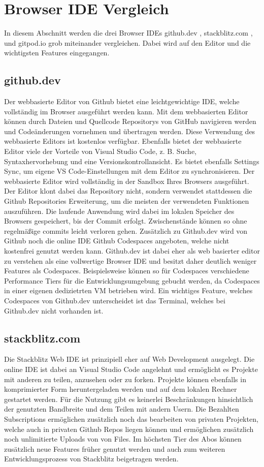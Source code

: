 \section{Browser IDE Vergleich}
In diesem Abschnitt werden die drei Browser IDEs
github.dev \cite{githubDevWebsite},
stackblitz.com \cite{stackblitzcomWebsite},
und
gitpod.io \cite{gitpodioWebsite}
grob miteinander vergleichen.
Dabei wird auf den Editor und die wichtigsten Features eingegangen.

\subsection{github.dev}
Der webbasierte Editor von Github bietet eine leichtgewichtige IDE, welche vollständig im Browser ausgeführt werden kann. Mit dem webbasierten Editor können durch Dateien und Quellcode Repositorys von GitHub navigieren werden und Codeänderungen vornehmen und übertragen werden. Diese Verwendung des webbasierte Editors ist kostenlos verfügbar.
Ebenfalls bietet der webbasierte Editor viele der Vorteile von Visual Studio Code, z. B. Suche, Syntaxhervorhebung und eine Versionskontrollansicht. Es bietet ebenfalls Settings Sync, um eigene VS Code-Einstellungen mit dem Editor zu synchronisieren.
Der webbasierte Editor wird vollständig in der Sandbox Ihres Browsers ausgeführt. Der Editor klont dabei das Repository nicht, sondern verwendet stattdessen die Github Repositories Erweiterung, um die meisten der verwendeten Funktionen auszuführen. Die laufende Anwendung wird dabei  im lokalen Speicher des Browsers gespeichert, bis der Commit erfolgt. Zwischenstände können so ohne regelmäßige commits leicht verloren gehen.
Zusätzlich zu Github.dev wird von Github noch die online IDE Github Codespaces angeboten, welche nicht kostenfrei genutzt werden kann. Github.dev ist dabei eher als web basierter editor zu verstehen als eine vollwertige Browser IDE  und besitzt daher deutlich weniger Features als Codespaces. Beispielsweise können so für Codespaces verschiedene Performance Tiers für die Entwicklungsumgebung gebucht werden, da Codespaces in einer eigenen dedizietrten VM betrieben wird. Ein wichtiges Feature, welches Codespaces von Github.dev unterscheidet ist das Terminal, welches bei Github.dev nicht vorhanden ist. 

\subsection{stackblitz.com}
Die Stackblitz Web IDE ist prinzipiell eher auf Web Development ausgelegt. Die online IDE ist dabei an Visual Studio Code angelehnt und ermöglicht es Projekte mit anderen zu teilen, anzusehen oder zu forken. Projekte können ebenfalls in komprimierter Form heruntergeladen werden und auf dem lokalen Rechner gestartet werden.
Für die Nutzung gibt es keinerlei Beschränkungen hinsichtlich der genutzten Bandbreite und dem Teilen mit andern Usern. Die Bezahlten Subscriptions ermöglichen zusätzlich noch das bearbeiten von privaten Projekten, welche auch in privaten Github Repos liegen können und ermöglichen zusätzlich noch unlimitierte Uploads von von Files. Im höchsten Tier des Abos können zusätzlich neue Features früher genutzt werden und auch zum weiteren Entwicklungsprozess von Stackblitz beigetragen werden. 


